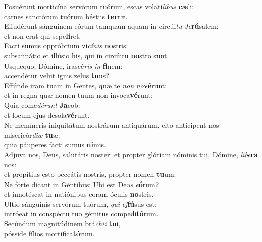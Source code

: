 \evenverse Posuérunt morticína servórum tuórum, escas volatí\textit{li}\textit{bus} \textbf{cæ}li:~\*\\
\evenverse carnes sanctórum tuórum béstiis \textbf{ter}ræ.\\
\oddverse Effudérunt sánguinem eórum tamquam aquam in circúi\textit{tu} \textit{Je}\textbf{rú}salem:~\*\\
\oddverse et non erat qui sepe\textbf{lí}ret.\\
\evenverse Facti sumus oppróbrium vi\textit{cí}\textit{nis} \textbf{no}stris:~\*\\
\evenverse subsannátio et illúsio his, qui in circúitu \textbf{no}stro sunt.\\
\oddverse Usquequo, Dómine, irascé\textit{ris} \textit{in} \textbf{fi}nem:~\*\\
\oddverse accendétur velut ignis zelus \textbf{tu}us?\\
\evenverse Effúnde iram tuam in Gentes, quæ te \textit{non} \textit{no}\textbf{vé}runt:~\*\\
\evenverse et in regna quæ nomen tuum non invoca\textbf{vé}runt:\\
\oddverse Quia come\textit{dé}\textit{runt} \textbf{Ja}cob:~\*\\
\oddverse et locum ejus desola\textbf{vé}runt.\\
\evenverse Ne memíneris iniquitátum nostrárum antiquárum, cito antícipent nos misericór\textit{di}\textit{æ} \textbf{tu}æ:~\*\\
\evenverse quia páuperes facti sumus \textbf{ni}mis.\\
\oddverse Adjuva nos, Deus, salutáris noster: et propter glóriam nóminis tui, Dómine, \textit{lí}\textit{be}\textbf{ra} nos:~\*\\
\oddverse et propítius esto peccátis nostris, propter nomen \textbf{tu}um:\\
\evenverse Ne forte dicant in Géntibus: Ubi est De\textit{us} \textit{e}\textbf{ó}rum?~\*\\
\evenverse et innotéscat in natiónibus coram óculis \textbf{no}stris.\\
\oddverse Ultio sánguinis servórum tuórum, \textit{qui} \textit{ef}\textbf{fú}sus est:~\*\\
\oddverse intróeat in conspéctu tuo gémitus compedi\textbf{tó}rum.\\
\evenverse Secúndum magnitúdinem brá\textit{chi}\textit{i} \textbf{tu}i,~\*\\
\evenverse pósside fílios mortifica\textbf{tó}rum.\\

